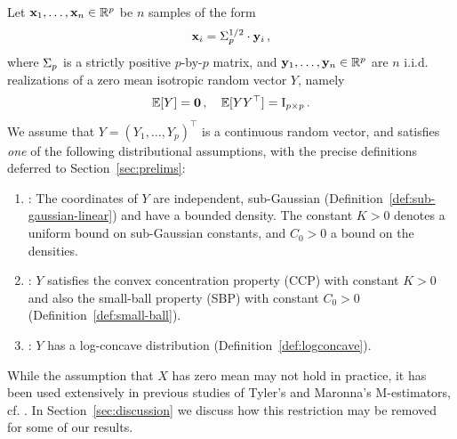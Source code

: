 \documentclass[times,sort&compress,3p]{elsarticle}
\begin{document}
Let ${\bf x}_1,\ldots,{\bf x}_n \in \mathbb{R}^p$ be $n$ samples of the form
\begin{equation}
\label{eq:X-Y}
        {\bf x}_i = \Sigma_p^{1/2} \cdot {\bf y}_i \,,
\end{equation}
where $\Sigma_p$ is a 
{strictly positive} $p$-by-$p$ matrix, 
and ${\bf y}_1,\ldots,{\bf y}_n \in \mathbb{R}^p$ are $n$ { i.i.d.} realizations of a zero mean isotropic random vector $Y$, namely
\begin{equation} \label{eq:Y-moments}
        {\mathbb{E}}[Y] = \mathbf{0}\,, \quad {\mathbb{E}}[Y Y^\top] = \mathrm{I}_{p \times p} \,.
\end{equation}
We assume that $Y=(Y_1,\ldots,Y_p)^\top$ is a continuous 
random vector, and
satisfies \emph{one} of the following distributional assumptions, with the precise definitions deferred to Section~\ref{sec:prelims}:
\begin{enumerate}[nosep]
    \item \AssumIndep: 
    The coordinates of $Y$ are independent, sub-Gaussian (Definition~\ref{def:sub-gaussian-linear})
    and have a bounded density. The constant $K>0$ denotes a uniform bound on sub-Gaussian constants, and $C_0>0$ a bound on the densities. 

    \item \AssumCCPSB: 
    $Y$ satisfies the convex concentration property (CCP) with constant $K>0$ and also the small-ball property (SBP) with constant $C_0>0$ (Definition~\ref{def:small-ball}).
    
    \item \AssumLC: $Y$ has a log-concave distribution (Definition~\ref{def:logconcave}).
\end{enumerate}

\begin{remark}
    While the assumption that $X$ has zero mean may not hold in practice, it has been used extensively in previous studies of Tyler's and Maronna's M-estimators, cf. \cite{couillet2014robust,zhang2016marvcenko,goes2017robust,auguin2018large}. In Section~\ref{sec:discussion} we discuss how this restriction may be removed for some of our results.

\end{remark}
\end{document}
